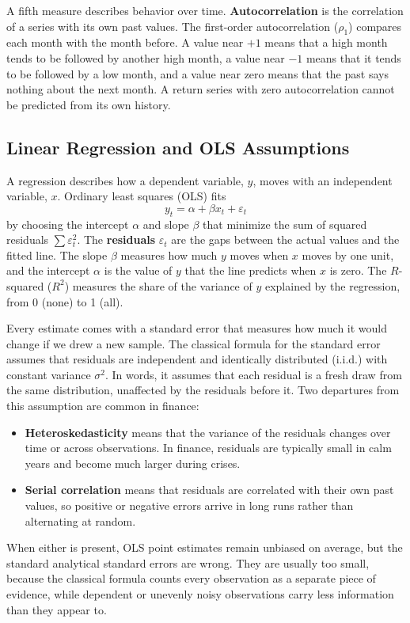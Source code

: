 A fifth measure describes behavior over time. \textbf{Autocorrelation} is the correlation of a series with its own past values. The first-order autocorrelation ($\rho_1$) compares each month with the month before. A value near $+1$ means that a high month tends to be followed by another high month, a value near $-1$ means that it tends to be followed by a low month, and a value near zero means that the past says nothing about the next month. A return series with zero autocorrelation cannot be predicted from its own history.

\subsection{Linear Regression and OLS Assumptions}
\label{sec:03-regression}
A regression describes how a dependent variable, $y$, moves with an independent variable, $x$. Ordinary least squares (OLS) fits
\begin{equation}
  y_t = \alpha + \beta x_t + \varepsilon_t
  \label{eq:03-ols}
\end{equation}
by choosing the intercept $\alpha$ and slope $\beta$ that minimize the sum of squared residuals $\sum \varepsilon_t^2$. The \textbf{residuals} $\varepsilon_t$ are the gaps between the actual values and the fitted line. The slope $\beta$ measures how much $y$ moves when $x$ moves by one unit, and the intercept $\alpha$ is the value of $y$ that the line predicts when $x$ is zero. The $R$-squared ($R^2$) measures the share of the variance of $y$ explained by the regression, from 0 (none) to 1 (all).

Every estimate comes with a standard error that measures how much it would change if we drew a new sample. The classical formula for the standard error assumes that residuals are independent and identically distributed (i.i.d.) with constant variance $\sigma^2$. In words, it assumes that each residual is a fresh draw from the same distribution, unaffected by the residuals before it. Two departures from this assumption are common in finance:
\begin{itemize}
  \item \textbf{Heteroskedasticity} means that the variance of the residuals changes over time or across observations. In finance, residuals are typically small in calm years and become much larger during crises.
  \item \textbf{Serial correlation} means that residuals are correlated with their own past values, so positive or negative errors arrive in long runs rather than alternating at random.
\end{itemize}
When either is present, OLS point estimates remain unbiased on average, but the standard analytical standard errors are wrong. They are usually too small, because the classical formula counts every observation as a separate piece of evidence, while dependent or unevenly noisy observations carry less information than they appear to.

